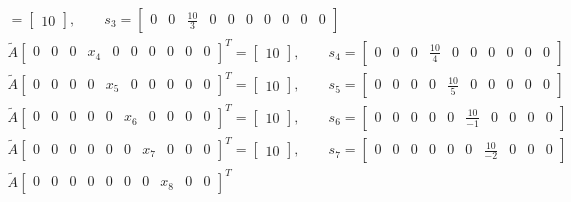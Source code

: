 \documentclass[10pt,a4paper]{article}
\theoremstyle{plain}
\theoremstyle{definition}
\begin{document}
\begin{enumerate}
\begin{align*}
  		=
  		\begin{bmatrix}10\end{bmatrix},\qquad s_3=\begin{bmatrix}
  			0 & 0 & \frac{10}{3} & 0 & 0 & 0 & 0 & 0 & 0 & 0
  		\end{bmatrix} \\
  		\tilde{A}
  		\begin{bmatrix}
  			0 & 0 & 0 & x_4 & 0 & 0 & 0 & 0 & 0 & 0
  		\end{bmatrix}^T
  		=
  		\begin{bmatrix}10\end{bmatrix},\qquad s_4=\begin{bmatrix}
  			0 & 0 & 0 & \frac{10}{4} & 0 & 0 & 0 & 0 & 0 & 0
  		\end{bmatrix} \\
  		\tilde{A}
  		\begin{bmatrix}
  			0 & 0 & 0 & 0 & x_5 & 0 & 0 & 0 & 0 & 0
  		\end{bmatrix}^T
  		=
  		\begin{bmatrix}10\end{bmatrix},\qquad s_5=\begin{bmatrix}
  			0 & 0 & 0 & 0 & \frac{10}{5} & 0 & 0 & 0 & 0 & 0
  		\end{bmatrix} \\
  		\tilde{A}
  		\begin{bmatrix}
  			0 & 0 & 0 & 0 & 0 & x_6 & 0 & 0 & 0 & 0
  		\end{bmatrix}^T
  		=
  		\begin{bmatrix}10\end{bmatrix},\qquad s_6=\begin{bmatrix}
  			0 & 0 & 0 & 0 & 0 & \frac{10}{-1} & 0 & 0 & 0 & 0
  		\end{bmatrix} \\
  		\tilde{A}
  		\begin{bmatrix}
  			0 & 0 & 0 & 0 & 0 & 0 & x_7 & 0 & 0 & 0
  		\end{bmatrix}^T
  		=
  		\begin{bmatrix}10\end{bmatrix},\qquad s_7=\begin{bmatrix}
  			0 & 0 & 0 & 0 & 0 & 0 & \frac{10}{-2} & 0 & 0 & 0
  		\end{bmatrix} \\
  		\tilde{A}
  		\begin{bmatrix}
  			0 & 0 & 0 & 0 & 0 & 0 & 0 & x_8 & 0 & 0
  		\end{bmatrix}^T

\end{align*}
\end{enumerate}
\end{document}
